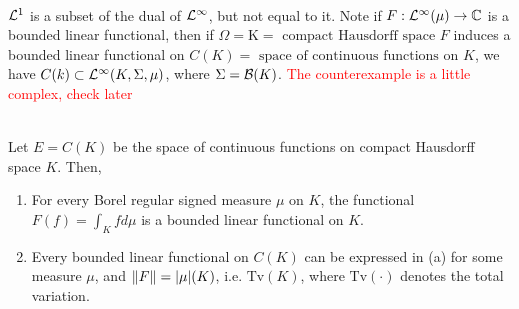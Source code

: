 \begin{remark}\ \\
$\mathcal{L}^1$ is a subset of the dual of $\mathcal{L}^\infty$, but not equal to it. Note if $F: \mathcal{L}^\infty (\mu) \to \mathbb{C}$ is a bounded linear functional, then if $\Omega = \mathrm{K} = \text{ compact Hausdorff space } F$ induces a bounded linear functional on $C(K) = \text{ space of continuous functions on } K$, we have $C(k) \subset \mathcal{L}^\infty (K, \Sigma, \mu)$, where $\Sigma = \mathcal{B}(K)$. \textcolor{red}{The counterexample is a little complex, check later}
\end{remark}

\begin{theorem}\label{RRT2}\ \\
Let $E = C(K)$ be the space of continuous functions on compact Hausdorff space $K$. Then,
\begin{enumerate}[label = (\alph*)]
    \item For every Borel regular signed measure $\mu$ on $K$, the functional $F(f) = \int_K f d\mu$ is a bounded linear functional on $K$.
    \item Every bounded linear functional on $C(K)$ can be expressed in (a) for some measure $\mu$, and $\norm{F} = \abs{\mu} (K)$, i.e. $\text{Tv}(K)$, where $\text{Tv}(\cdot)$ denotes the total variation. 
\end{enumerate}
\end{theorem}


\vspace{12pt}
